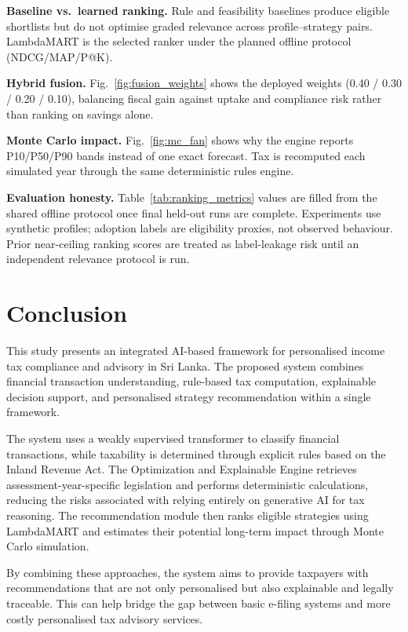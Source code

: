 \documentclass[conference]{IEEEtran}
\begin{document}
\textbf{Baseline vs.\ learned ranking.} Rule and feasibility baselines produce eligible shortlists but do not optimise graded relevance across profile--strategy pairs. LambdaMART is the selected ranker under the planned offline protocol (NDCG/MAP/P@K).

\textbf{Hybrid fusion.} Fig.~\ref{fig:fusion_weights} shows the deployed weights (0.40 / 0.30 / 0.20 / 0.10), balancing fiscal gain against uptake and compliance risk rather than ranking on savings alone.

\textbf{Monte Carlo impact.} Fig.~\ref{fig:mc_fan} shows why the engine reports P10/P50/P90 bands instead of one exact forecast. Tax is recomputed each simulated year through the same deterministic rules engine.

\textbf{Evaluation honesty.} Table~\ref{tab:ranking_metrics} values are filled from the shared offline protocol once final held-out runs are complete. Experiments use synthetic profiles; adoption labels are eligibility proxies, not observed behaviour. Prior near-ceiling ranking scores are treated as label-leakage risk until an independent relevance protocol is run.

\section{Conclusion}
This study presents an integrated AI-based framework for personalised income tax compliance and advisory in Sri Lanka. The proposed system combines financial transaction understanding, rule-based tax computation, explainable decision support, and personalised strategy recommendation within a single framework.

The system uses a weakly supervised transformer to classify financial transactions, while taxability is determined through explicit rules based on the Inland Revenue Act. The Optimization and Explainable Engine retrieves assessment-year-specific legislation and performs deterministic calculations, reducing the risks associated with relying entirely on generative AI for tax reasoning. The recommendation module then ranks eligible strategies using LambdaMART and estimates their potential long-term impact through Monte Carlo simulation.

By combining these approaches, the system aims to provide taxpayers with recommendations that are not only personalised but also explainable and legally traceable. This can help bridge the gap between basic e-filing systems and more costly personalised tax advisory services.
\end{document}
